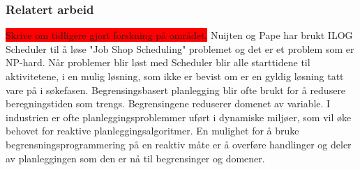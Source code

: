 \subsubsection{Relatert arbeid}
\colorbox{red}{Skrive om tidligere gjort forskning på området.}
Nuijten og Pape har brukt ILOG Scheduler til å løse "Job Shop Scheduling" problemet  og det er et problem som er NP-hard. Når problemer blir løst med Scheduler blir alle starttidene til aktivitetene, i en mulig løsning, som ikke er bevist om er en gyldig løsning tatt vare på i søkefasen. Begrensingsbasert planlegging blir ofte brukt for å redusere beregningstiden som trengs. Begrensingene reduserer domenet av variable. I industrien er ofte planleggingsproblemmer uført i dynamiske miljøer, som vil øke behovet for reaktive planleggingsalgoritmer. En mulighet for å bruke begrensningsprogrammering på en reaktiv måte er å overføre handlinger og deler av planleggingen som den er nå til begrensinger og domener. \cite{Nuijten:1998:CJS:594934.594971}
